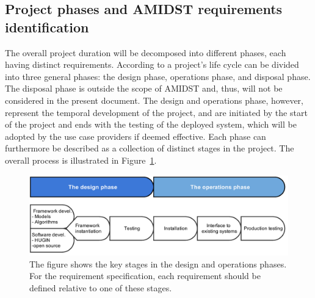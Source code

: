 \subsection{Project phases and AMIDST requirements identification }


The overall project duration will be decomposed into different phases, each having distinct requirements. According to
\cite{Eig09} a project's life cycle can be divided into three general phases: the design phase, operations phase, and
disposal phase. The disposal phase is outside the scope of AMIDST and, thus, will not be considered in the present
document. The design and operations phase, however, represent the
temporal development of the project, and are initiated by the start of the project and ends with the testing of the
deployed system, which will be adopted by the use case providers if deemed effective. Each
phase can furthermore be described as a collection of distinct stages in the project. The overall process is
illustrated in Figure~\ref{REprocess2}. 

%

\begin{figure}[htbp]
\centering
\includegraphics [keepaspectratio,width = 14cm] {amidst_phases}
\caption{The figure shows the key stages in the design and operations phases. For the requirement specification, each
  requirement should be defined relative to one of these stages.} 
\label{REprocess2}
\end{figure}




